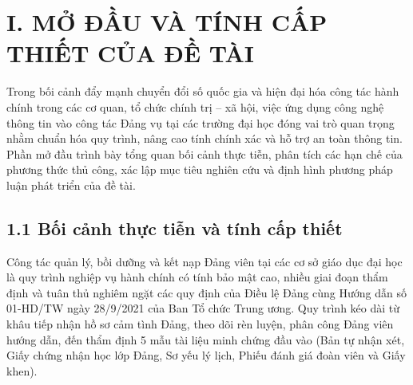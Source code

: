 \documentclass[12pt,a4paper]{report}
\begin{document}
\cleardoublepage
\makeatletter
\let\oldcleardoublepage\cleardoublepage
\let\oldclearpage\clearpage
\renewcommand{\cleardoublepage}{\par\vspace{1.5em}}
\renewcommand{\clearpage}{\par\vspace{1.5em}}
\makeatother

\setcounter{page}{1}

\section*{I. MỞ ĐẦU VÀ TÍNH CẤP THIẾT CỦA ĐỀ TÀI}

Trong bối cảnh đẩy mạnh chuyển đổi số quốc gia và hiện đại hóa công tác hành chính trong các cơ quan, tổ chức chính trị -- xã hội, việc ứng dụng công nghệ thông tin vào công tác Đảng vụ tại các trường đại học đóng vai trò quan trọng nhằm chuẩn hóa quy trình, nâng cao tính chính xác và hỗ trợ an toàn thông tin. Phần mở đầu trình bày tổng quan bối cảnh thực tiễn, phân tích các hạn chế của phương thức thủ công, xác lập mục tiêu nghiên cứu và định hình phương pháp luận phát triển của đề tài.

\subsection*{1.1 Bối cảnh thực tiễn và tính cấp thiết}
Công tác quản lý, bồi dưỡng và kết nạp Đảng viên tại các cơ sở giáo dục đại học là quy trình nghiệp vụ hành chính có tính bảo mật cao, nhiều giai đoạn thẩm định và tuân thủ nghiêm ngặt các quy định của Điều lệ Đảng cùng Hướng dẫn số 01-HD/TW ngày 28/9/2021 của Ban Tổ chức Trung ương. Quy trình kéo dài từ khâu tiếp nhận hồ sơ cảm tình Đảng, theo dõi rèn luyện, phân công Đảng viên hướng dẫn, đến thẩm định 5 mẫu tài liệu minh chứng đầu vào (Bản tự nhận xét, Giấy chứng nhận học lớp Đảng, Sơ yếu lý lịch, Phiếu đánh giá đoàn viên và Giấy khen).
\end{document}
